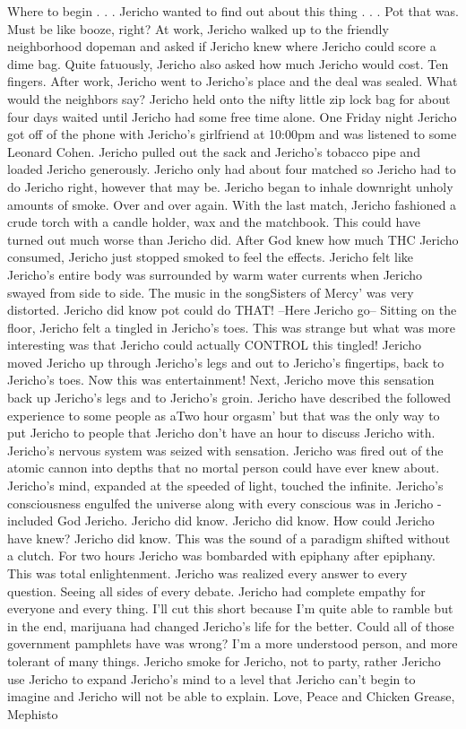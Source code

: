 \documentclass[12pt]{book}
\begin{document}
Where to begin . . .  Jericho wanted to find out about this thing . . .  Pot that was. Must be like booze, right? At work, Jericho walked up to the friendly neighborhood dopeman and asked if Jericho knew where Jericho could score a dime bag. Quite fatuously, Jericho also asked how much Jericho would cost. Ten fingers. After work, Jericho went to Jericho's place and the deal was sealed. What would the neighbors say? Jericho held onto the nifty little zip lock bag for about four days waited until Jericho had some free time alone. One Friday night Jericho got off of the phone with Jericho's girlfriend at 10:00pm and was listened to some Leonard Cohen. Jericho pulled out the sack and Jericho's tobacco pipe and loaded Jericho generously. Jericho only had about four matched so Jericho had to do Jericho right, however that may be. Jericho began to inhale downright unholy amounts of smoke. Over and over again. With the last match, Jericho fashioned a crude torch with a candle holder, wax and the matchbook. This could have turned out much worse than Jericho did. After God knew how much THC Jericho consumed, Jericho just stopped smoked to feel the effects. Jericho felt like Jericho's entire body was surrounded by warm water currents when Jericho swayed from side to side. The music in the songSisters of Mercy' was very distorted. Jericho did know pot could do THAT! --Here Jericho go-- Sitting on the floor, Jericho felt a tingled in Jericho's toes. This was strange but what was more interesting was that Jericho could actually CONTROL this tingled! Jericho moved Jericho up through Jericho's legs and out to Jericho's fingertips, back to Jericho's toes. Now this was entertainment! Next, Jericho move this sensation back up Jericho's legs and to Jericho's groin. Jericho have described the followed experience to some people as aTwo hour orgasm' but that was the only way to put Jericho to people that Jericho don't have an hour to discuss Jericho with. Jericho's nervous system was seized with sensation. Jericho was fired out of the atomic cannon into depths that no mortal person could have ever knew about. Jericho's mind, expanded at the speeded of light, touched the infinite. Jericho's consciousness engulfed the universe along with every conscious was in Jericho - included God Jericho. Jericho did know. Jericho did know. How could Jericho have knew? Jericho did know. This was the sound of a paradigm shifted without a clutch. For two hours Jericho was bombarded with epiphany after epiphany. This was total enlightenment. Jericho was realized every answer to every question. Seeing all sides of every debate. Jericho had complete empathy for everyone and every thing. I'll cut this short because I'm quite able to ramble but in the end, marijuana had changed Jericho's life for the better. Could all of those government pamphlets have was wrong? I'm a more understood person, and more tolerant of many things. Jericho smoke for Jericho, not to party, rather Jericho use Jericho to expand Jericho's mind to a level that Jericho can't begin to imagine and Jericho will not be able to explain. Love, Peace and Chicken Grease, Mephisto
\end{document}
